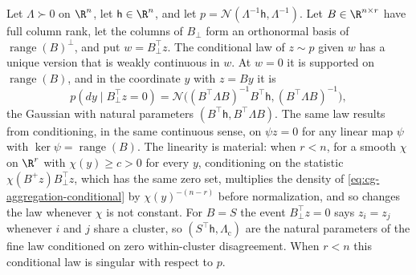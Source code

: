 Let \(\Lambda\succ0\) on \(\R^n\), let \(\mathsf h\in\R^n\), and let
\(p=\mathcal N(\Lambda^{-1}\mathsf h,\Lambda^{-1})\). Let
\(B\in\R^{n\times r}\) have full column rank, let the columns of \(B_\perp\)
form an orthonormal basis of \(\operatorname{range}(B)^\perp\), and put
\(w=B_\perp^\top z\). The conditional law of \(z\sim p\) given \(w\) has a
unique version that is weakly continuous in \(w\). At \(w=0\) it is supported
on \(\operatorname{range}(B)\), and in the coordinate \(y\) with \(z=By\) it is
\begin{equation}
p(dy\mid B_\perp^\top z=0)
=\mathcal N\bigl((B^\top\Lambda B)^{-1}B^\top\mathsf h,(B^\top\Lambda B)^{-1}\bigr),
\label{eq:cg-aggregation-conditional}
\end{equation}
the Gaussian with natural parameters \((B^\top\mathsf h,B^\top\Lambda B)\). The
same law results from conditioning, in the same continuous sense, on
\(\psi z=0\) for any linear map \(\psi\) with \(\ker\psi=\operatorname{range}(B)\).
The linearity is material: when \(r<n\), for a smooth \(\chi\) on \(\R^r\) with
\(\chi(y)\geq c>0\) for every \(y\), conditioning on
the statistic \(\chi(B^+z)B_\perp^\top z\), which has the same zero set,
multiplies the density of \eqref{eq:cg-aggregation-conditional} by
\(\chi(y)^{-(n-r)}\) before normalization, and so changes the law whenever
\(\chi\) is not constant. For \(B=S\) the event \(B_\perp^\top z=0\) says
\(z_i=z_j\) whenever \(i\) and \(j\) share a cluster, so
\((S^\top\mathsf h,\Lambda_{\mathrm c})\) are the natural parameters of the fine
law conditioned on zero within-cluster disagreement. When \(r<n\) this
conditional law is singular with respect to \(p\). 

